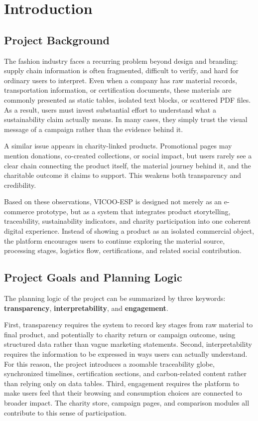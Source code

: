 \documentclass[11pt]{article}
\newcommand{\projectname}{VICOO-ESP}
\begin{document}
\tableofcontents

\section{Introduction}
\subsection{Project Background}
The fashion industry faces a recurring problem beyond design and branding: supply chain information is often fragmented, difficult to verify, and hard for ordinary users to interpret. Even when a company has raw material records, transportation information, or certification documents, these materials are commonly presented as static tables, isolated text blocks, or scattered PDF files. As a result, users must invest substantial effort to understand what a sustainability claim actually means. In many cases, they simply trust the visual message of a campaign rather than the evidence behind it.

A similar issue appears in charity-linked products. Promotional pages may mention donations, co-created collections, or social impact, but users rarely see a clear chain connecting the product itself, the material journey behind it, and the charitable outcome it claims to support. This weakens both transparency and credibility.

Based on these observations, \projectname{} is designed not merely as an e-commerce prototype, but as a system that integrates product storytelling, traceability, sustainability indicators, and charity participation into one coherent digital experience. Instead of showing a product as an isolated commercial object, the platform encourages users to continue exploring the material source, processing stages, logistics flow, certifications, and related social contribution.

\subsection{Project Goals and Planning Logic}
The planning logic of the project can be summarized by three keywords: \textbf{transparency}, \textbf{interpretability}, and \textbf{engagement}.

First, transparency requires the system to record key stages from raw material to final product, and potentially to charity return or campaign outcome, using structured data rather than vague marketing statements. Second, interpretability requires the information to be expressed in ways users can actually understand. For this reason, the project introduces a zoomable traceability globe, synchronized timelines, certification sections, and carbon-related content rather than relying only on data tables. Third, engagement requires the platform to make users feel that their browsing and consumption choices are connected to broader impact. The charity store, campaign pages, and comparison modules all contribute to this sense of participation.
\end{document}
